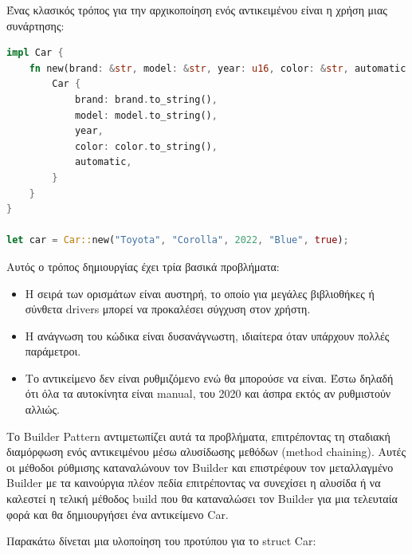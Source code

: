 Ένας κλασικός τρόπος για την αρχικοποίηση ενός αντικειμένου είναι η χρήση μιας συνάρτησης:

\begin{lstlisting}[language=Rust]
impl Car {
    fn new(brand: &str, model: &str, year: u16, color: &str, automatic: bool) -> Self {
        Car {
            brand: brand.to_string(),
            model: model.to_string(),
            year,
            color: color.to_string(),
            automatic,
        }
    }
}

let car = Car::new("Toyota", "Corolla", 2022, "Blue", true);
\end{lstlisting}

Αυτός ο τρόπος δημιουργίας έχει τρία βασικά προβλήματα:

\begin{itemize}
\item Η σειρά των ορισμάτων είναι αυστηρή, το οποίο για μεγάλες βιβλιοθήκες ή σύνθετα
  drivers μπορεί να προκαλέσει σύγχυση στον χρήστη.
\item Η ανάγνωση του κώδικα είναι δυσανάγνωστη, ιδιαίτερα όταν υπάρχουν πολλές παράμετροι.
\item Το αντικείμενο δεν είναι ρυθμιζόμενο ενώ θα μπορούσε να είναι. Έστω δηλαδή ότι όλα
  τα αυτοκίνητα είναι manual, του 2020 και άσπρα εκτός αν ρυθμιστούν αλλιώς.
\end{itemize}

Το Builder Pattern αντιμετωπίζει αυτά τα προβλήματα, επιτρέποντας τη
σταδιακή διαμόρφωση ενός αντικειμένου μέσω αλυσίδωσης μεθόδων (method
chaining). Αυτές οι μέθοδοι ρύθμισης καταναλώνουν τον Builder και επιστρέφουν τον
μεταλλαγμένο Builder με τα καινούργια πλέον πεδία επιτρέποντας να συνεχίσει η αλυσίδα
ή να καλεστεί η τελική μέθοδος build που θα καταναλώσει τον Builder για μια τελευταία
φορά και θα δημιουργήσει ένα αντικείμενο Car.

Παρακάτω δίνεται μια υλοποίηση του προτύπου για το struct Car:


